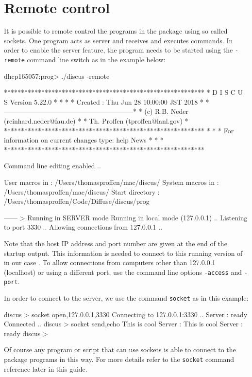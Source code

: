 
\section{Remote control\label{remote}}

It is possible to remote control the programs in the \Discus package
using so called sockets. One program acts as server and receives and 
executes commands. In order to enable the server feature, the program
needs to be started using the {\tt -remote} command line switch as in
the example below:
%
\begin{MacVerbatim}
dhcp165057:prog> ./discus -remote

          ***********************************************************
          *               D I S C U S   Version 5.22.0              *
          *                                                         *
          *         Created : Thu Jun 28 10:00:00 JST 2018          *
          *---------------------------------------------------------*
          * (c) R.B. Neder  (reinhard.neder@fau.de)                 *
          *     Th. Proffen (tproffen@lanl.gov)                     *
          ***********************************************************
          *                                                         *
          * For information on current changes type: help News      *
          *                                                         *
          ***********************************************************

 Command line editing enabled ..

 User macros in   : /Users/thomasproffen/mac/discus/
 System macros in : /Users/thomasproffen/mac/discus/
 Start directory  : /Users/thomasproffen/Code/Diffuse/discus/prog

 ------ > Running in SERVER mode
 Running in local mode (127.0.0.1) ..
 Listening to port 3330 ..
 Allowing connections from 127.0.0.1 ..
\end{MacVerbatim}
%
Note that the host IP address and port number are given at the end
of the startup output. This information is needed to connect to this 
running version of in our case \discus. To allow connections from
computers other than 127.0.0.1 (localhost) or using a different port,
use the command line options {\tt -access} and {\tt -port}.

In order to connect to the \Discus server, we use the command 
{\tt socket} as in this example:
%
\begin{MacVerbatim}
 discus > socket open,127.0.0.1,3330
 Connecting to 127.0.0.1:3330 ..
 Server : ready
 Connected ..
 discus > socket send,echo This is cool
 Server :  This is cool
 Server : ready
 discus > 
\end{MacVerbatim}
%
Of course any program or script that can use sockets is able to connect
to the \Discus package programs in this way. For more details refer
to the {\tt socket} command reference later in this guide.


